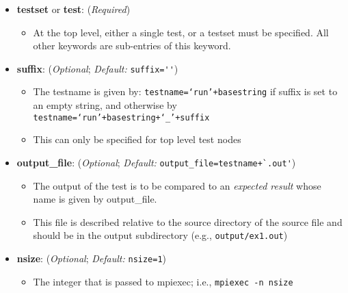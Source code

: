 \begin{itemize}

  \item[] \textbf{testset} or \textbf{test}: (\emph{Required})

    \begin{itemize}

      \item[] At the top level, either a single test, or a testset must
            be specified.   All other keywords are sub-entries of this keyword.

    \end{itemize}

  \item[]  \textbf{suffix}: (\emph{Optional}; \emph{Default:} \lstinline{suffix=''})
    \begin{itemize}

      \item The testname is given by: \texttt{testname=`run'+basestring} if suffix is set to an empty string, and otherwise by \texttt{ testname=`run'+basestring+`\_'+suffix}

      \item This can only be specified for top level test nodes

     \end{itemize}


   \item[]  \textbf{output\_file}: (\emph{Optional}; \emph{Default:} 
                 \lstinline{output_file=testname+`.out'})
      \begin{itemize}

      \item The output of the test is to be compared to an \emph{expected result}
      whose name is given by output\_file.

      \item This file is described relative to the source directory of the
      source file and should be in the output subdirectory (e.g.,
      \lstinline{output/ex1.out})

      \end{itemize}


    \item[]  \textbf{nsize}: (\emph{Optional}; \emph{Default:} \lstinline{nsize=1})
      \begin{itemize}

      \item The integer that is passed to mpiexec; i.e., \lstinline{mpiexec -n nsize}


\end{itemize}
\end{itemize}
